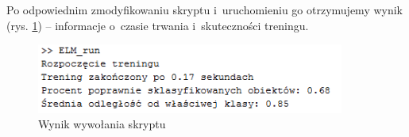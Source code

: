 \documentclass{article}
\begin{document}
Po odpowiednim zmodyfikowaniu skryptu i~uruchomieniu go otrzymujemy wynik (rys. \ref{elm_run_result}) -- informacje o~czasie trwania i~skuteczności treningu.
\begin{figure}[H]
\centering
\includegraphics[width=0.9\textwidth]{elm_results.PNG}
\caption{Wynik wywołania skryptu}
\label{elm_run_result}
\end{figure}
\end{document}
